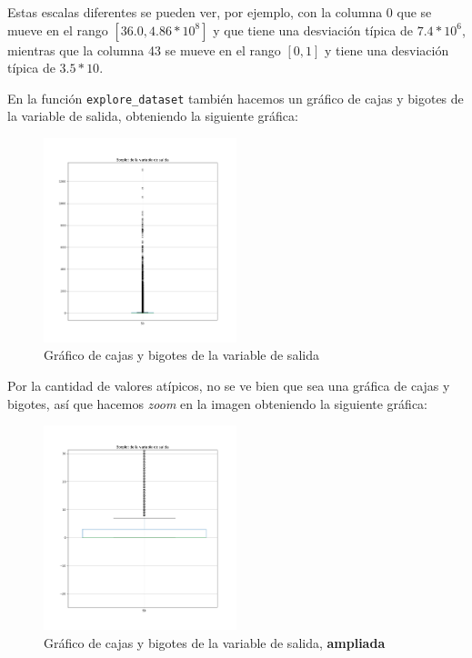 \documentclass[11pt]{article}
\begin{document}
Estas escalas diferentes se pueden ver, por ejemplo, con la columna 0 que se mueve en el rango $[36.0, 4.86 * 10^8]$ y que tiene una desviación típica de $7.4 * 10^6$, mientras que la columna 43 se mueve en el rango $[0, 1]$ y tiene una desviación típica de $3.5 * 10$.

En la función \lstinline{explore_dataset} también hacemos un gráfico de cajas y bigotes de la variable de salida, obteniendo la siguiente gráfica:

\begin{figure}[H]
  \centering
  \includegraphics[width=0.5\textwidth]{boxplot_salida}
  \caption{Gráfico de cajas y bigotes de la variable de salida}
\end{figure}

Por la cantidad de valores atípicos, no se ve bien que sea una gráfica de cajas y bigotes, así que hacemos \emph{zoom} en la imagen obteniendo la siguiente gráfica:

\begin{figure}[H]
  \centering
  \includegraphics[width=0.5\textwidth]{boxplot_salida_zoom}
  \caption{Gráfico de cajas y bigotes de la variable de salida, \textbf{ampliada}}
\end{figure}
\end{document}
